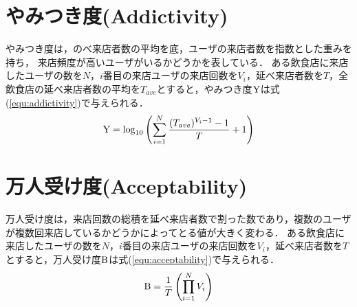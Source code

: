 \section{やみつき度(Addictivity)}

やみつき度は，のべ来店者数の平均を底，ユーザの来店者数を指数とした重みを持ち，
来店頻度が高いユーザがいるかどうかを表している．
ある飲食店に来店したユーザの数を$N$，$i$番目の来店ユーザの来店回数を$V_i$，延べ来店者数を$T$，全飲食店の延べ来店者数の平均を$T_{ave}$とすると，やみつき度$\rm Y$は式(\ref{equ:addictivity})で与えられる．
\begin{equation}
	\label{equ:addictivity}
	{\rm Y} = \log_{10}{\left(\sum^{N}_{i=1} \frac{(T_{ave})^{V_i-1}-1}{T}+1\right)}
\end{equation}

\section{万人受け度(Acceptability)}

万人受け度は，来店回数の総積を延べ来店者数で割った数であり，複数のユーザが複数回来店しているかどうかによってとる値が大きく変わる．
ある飲食店に来店したユーザの数を$N$，$i$番目の来店ユーザの来店回数を$V_i$，延べ来店者数を$T$とすると，万人受け度$\rm B$は式(\ref{equ:acceptability})で与えられる．
\begin{equation}
	\label{equ:acceptability}
	{\rm B} = \frac{1}{T} \left(\prod^N_{i=1}V_i\right)
\end{equation}

